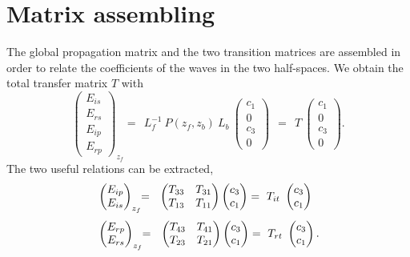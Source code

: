 \section{Matrix assembling}

The global propagation matrix and the two transition matrices are assembled in order to relate the coefficients of the waves in the two half-spaces.
We obtain the total transfer matrix $T$ with
$$
\begin{pmatrix}
E_{is}\\
E_{rs}\\
E_{ip}\\
E_{rp}
\end{pmatrix}_{z_f}
\!\!
= 
\ \ 
L_f^{-1}\ P(z_f, z_b)\ L_b \ 
\begin{pmatrix}
c_1\\ 0 \\ c_3\\ 0
\end{pmatrix} 
\ \ 
= 
\ \ 
T \ 
\begin{pmatrix}
c_1\\ 0 \\ c_3\\ 0
\end{pmatrix}.
$$
The two useful relations can be extracted,
\begin{align*}
& 
\begin{pmatrix}
E_{ip} \\ E_{is}
\end{pmatrix}_{z_f} \!\! = \ \ 
\begin{pmatrix}
T_{33} & T_{31} \\
T_{13} & T_{11} 
\end{pmatrix}
\begin{pmatrix}
c_3 \\ c_1
\end{pmatrix} = \ T_{it} \ 
\begin{pmatrix}
c_3 \\ c_1
\end{pmatrix}\hphantom{.} 
\\[3pt]
&
\begin{pmatrix}
E_{rp} \\ E_{rs} 
\end{pmatrix}_{z_f} \!\! = \ \ 
\begin{pmatrix}
T_{43} & T_{41} \\
T_{23} & T_{21} 
\end{pmatrix}
\begin{pmatrix}
c_3\\ c_1
\end{pmatrix} =\ T_{rt} \ 
\begin{pmatrix}
c_3\\ c_1
\end{pmatrix}.
\end{align*}

